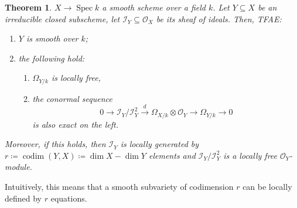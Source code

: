 \documentclass[12pt]{article}
\DeclareMathOperator{\Spec}{Spec}
\DeclareMathOperator{\codim}{codim}
\newtheorem*{theorem}{Theorem}
\theoremstyle{definition}
\begin{document}
\begin{theorem}
$X\rightarrow\Spec k$ a smooth scheme over a field $k$. Let $Y\subseteq X$ be an irreducible closed subscheme, let $\mathcal I_Y\subseteq\mathcal O_X$ be its sheaf of ideals. Then, TFAE:
\begin{enumerate}[label=\arabic*)]
\item $Y$ is smooth over $k$;
\item\label{sub_smooth} the following hold:
\begin{enumerate}[label=\alph*)]
\item\label{sub_free} $\Omega_{Y/k}$ is locally free,
\item\label{sub_cunumi} the conormal sequence
\[0\longrightarrow\mathcal I_Y/\mathcal I_Y^2\overset d\longrightarrow\Omega_{X/k}\otimes\mathcal O_Y\longrightarrow\Omega_{Y/k}\longrightarrow0\]
is also exact on the left.
\end{enumerate}
\end{enumerate}

Moreover, if this holds, then $\mathcal I_Y$ is locally generated by $r\coloneqq\codim(Y,X)\coloneqq\dim X-\dim Y$ elements and $\mathcal I_Y/\mathcal I_Y^2$ is a locally free $\mathcal O_Y$-module.
\end{theorem}

Intuitively, this means that a smooth subvariety of codimension $r$ can be locally defined by $r$ equations.
\end{document}

